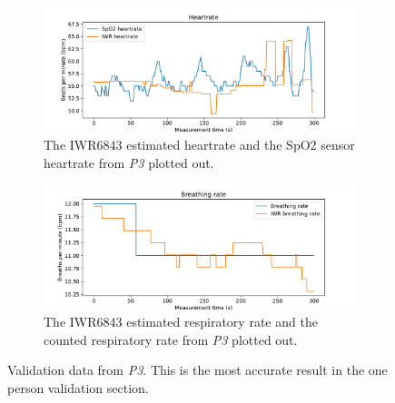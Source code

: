 \begin{figure}[t]
\begin{subfigure}{\textwidth}
  \centering
  \includegraphics[width=\linewidth]{figures/validation/roy_heart.pdf}  
  \caption{The IWR6843 estimated heartrate and the SpO2 sensor heartrate from \emph{P3} plotted out.}
  \label{fig:roy_heart}
\end{subfigure}
\begin{subfigure}{\textwidth}
  \centering
  \includegraphics[width=\linewidth]{figures/validation/roy_breath.pdf}  
  \caption{The IWR6843 estimated respiratory rate and the counted respiratory rate from \emph{P3} plotted out.}
  \label{fig:roy_breath}
\end{subfigure}
\caption{Validation data from \emph{P3}. This is the most accurate result in the one person validation section.}
\label{fig:roy_meas}
\end{figure}


